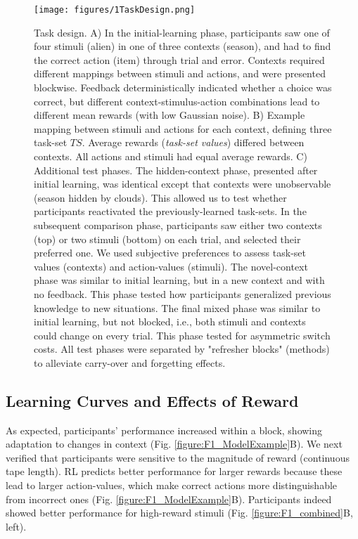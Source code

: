 \documentclass[10pt,letterpaper]{article}  %
\begin{document}
\begin{figure}%
    \begin{center}
	\texttt{[image: figures/1TaskDesign.png]}
    \end{center}
    \caption{Task design. A) In the initial-learning phase, participants saw one of four stimuli (alien) in one of three contexts (season), and had to find the correct action (item) through trial and error. Contexts required different mappings between stimuli and actions, and were presented blockwise. Feedback deterministically indicated whether a choice was correct, but different context-stimulus-action combinations lead to different mean rewards (with low Gaussian noise). B) Example mapping between stimuli and actions for each context, defining three task-set $TS$. Average rewards (\textit{task-set values}) differed between contexts. All actions and stimuli had equal average rewards. C) Additional test phases. The hidden-context phase, presented after initial learning, was identical except that contexts were unobservable (season hidden by clouds). This allowed us to test whether participants reactivated the previously-learned task-sets. In the subsequent comparison phase, participants saw either two contexts (top) or two stimuli (bottom) on each trial, and selected their preferred one. We used subjective preferences to assess task-set values (contexts) and action-values (stimuli). The novel-context phase was similar to initial learning, but in a new context and with no feedback. This phase tested how participants generalized previous knowledge to new situations. The final mixed phase was similar to initial learning, but not blocked, i.e., both stimuli and contexts could change on every trial. This phase tested for asymmetric switch costs. All test phases were separated by "refresher blocks" (methods) to alleviate carry-over and forgetting effects.}
    \label{figure:1TaskDesign}
\end{figure}

\subsection*{Learning Curves and Effects of Reward}
\label{section:LearningCurves}
As expected, participants' performance increased within a block, showing adaptation to changes in context (Fig. \ref{figure:F1_ModelExample}B). We next verified that participants were sensitive to the magnitude of reward (continuous tape length).
RL predicts better performance for larger rewards because these lead to larger action-values, which make correct actions more distinguishable from incorrect ones (Fig. \ref{figure:F1_ModelExample}B). Participants indeed showed better performance for high-reward stimuli (Fig. \ref{figure:F1_combined}B, left).
\end{document}
